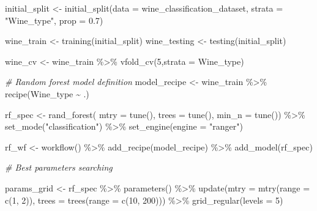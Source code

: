 \documentclass[
]{book}
\newenvironment{Shaded}{\begin{snugshade}}{\end{snugshade}}
\newcommand{\AttributeTok}[1]{\textcolor[rgb]{0.77,0.63,0.00}{#1}}
\newcommand{\CommentTok}[1]{\textcolor[rgb]{0.56,0.35,0.01}{\textit{#1}}}
\newcommand{\DecValTok}[1]{\textcolor[rgb]{0.00,0.00,0.81}{#1}}
\newcommand{\FloatTok}[1]{\textcolor[rgb]{0.00,0.00,0.81}{#1}}
\newcommand{\FunctionTok}[1]{\textcolor[rgb]{0.00,0.00,0.00}{#1}}
\newcommand{\NormalTok}[1]{#1}
\newcommand{\OtherTok}[1]{\textcolor[rgb]{0.56,0.35,0.01}{#1}}
\newcommand{\SpecialCharTok}[1]{\textcolor[rgb]{0.00,0.00,0.00}{#1}}
\newcommand{\StringTok}[1]{\textcolor[rgb]{0.31,0.60,0.02}{#1}}
\begin{document}
\begin{Shaded}
\begin{Highlighting}[]
\NormalTok{initial\_split }\OtherTok{\textless{}{-}} \FunctionTok{initial\_split}\NormalTok{(}\AttributeTok{data =}\NormalTok{ wine\_classification\_dataset, }\AttributeTok{strata =} \StringTok{"Wine\_type"}\NormalTok{, }\AttributeTok{prop =} \FloatTok{0.7}\NormalTok{)}

\NormalTok{wine\_train }\OtherTok{\textless{}{-}} \FunctionTok{training}\NormalTok{(initial\_split)}
\NormalTok{wine\_testing }\OtherTok{\textless{}{-}} \FunctionTok{testing}\NormalTok{(initial\_split)}

\NormalTok{wine\_cv }\OtherTok{\textless{}{-}}\NormalTok{ wine\_train }\SpecialCharTok{\%\textgreater{}\%} \FunctionTok{vfold\_cv}\NormalTok{(}\DecValTok{5}\NormalTok{,}\AttributeTok{strata =}\NormalTok{ Wine\_type)}

\CommentTok{\# Random forest model definition}
\NormalTok{model\_recipe }\OtherTok{\textless{}{-}}\NormalTok{ wine\_train }\SpecialCharTok{\%\textgreater{}\%} 
  \FunctionTok{recipe}\NormalTok{(Wine\_type }\SpecialCharTok{\textasciitilde{}}\NormalTok{ .)}

\NormalTok{rf\_spec }\OtherTok{\textless{}{-}} \FunctionTok{rand\_forest}\NormalTok{(}
  \AttributeTok{mtry =} \FunctionTok{tune}\NormalTok{(),}
  \AttributeTok{trees =} \FunctionTok{tune}\NormalTok{(),}
  \AttributeTok{min\_n =} \FunctionTok{tune}\NormalTok{()) }\SpecialCharTok{\%\textgreater{}\%}
  \FunctionTok{set\_mode}\NormalTok{(}\StringTok{"classification"}\NormalTok{) }\SpecialCharTok{\%\textgreater{}\%} 
  \FunctionTok{set\_engine}\NormalTok{(}\AttributeTok{engine =} \StringTok{"ranger"}\NormalTok{)}

\NormalTok{rf\_wf }\OtherTok{\textless{}{-}} \FunctionTok{workflow}\NormalTok{() }\SpecialCharTok{\%\textgreater{}\%}
  \FunctionTok{add\_recipe}\NormalTok{(model\_recipe) }\SpecialCharTok{\%\textgreater{}\%} 
  \FunctionTok{add\_model}\NormalTok{(rf\_spec)}


\CommentTok{\# Best parameters searching}

\NormalTok{params\_grid }\OtherTok{\textless{}{-}}\NormalTok{ rf\_spec }\SpecialCharTok{\%\textgreater{}\%}
  \FunctionTok{parameters}\NormalTok{() }\SpecialCharTok{\%\textgreater{}\%}
  \FunctionTok{update}\NormalTok{(}\AttributeTok{mtry =} \FunctionTok{mtry}\NormalTok{(}\AttributeTok{range =} \FunctionTok{c}\NormalTok{(}\DecValTok{1}\NormalTok{, }\DecValTok{2}\NormalTok{)),}
         \AttributeTok{trees =} \FunctionTok{trees}\NormalTok{(}\AttributeTok{range =} \FunctionTok{c}\NormalTok{(}\DecValTok{10}\NormalTok{, }\DecValTok{200}\NormalTok{))) }\SpecialCharTok{\%\textgreater{}\%} 
  \FunctionTok{grid\_regular}\NormalTok{(}\AttributeTok{levels =} \DecValTok{5}\NormalTok{)}


\end{Highlighting}
\end{Shaded}
\end{document}

